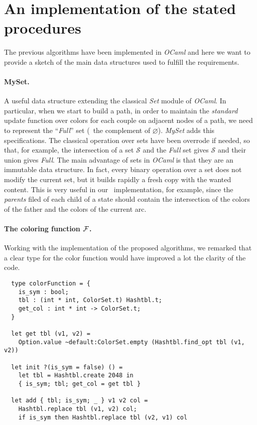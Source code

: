 \section{An implementation of the stated procedures}

The previous algorithms have been implemented in \textit{OCaml} and here we want to provide a sketch of the main data structures used to fulfill the requirements.

\paragraph{MySet.} A useful data structure extending the classical \textit{Set} module of \textit{OCaml}. In particular, when we start to build a path, in order to maintain the \textit{standard} update function over colors for each couple on adjacent nodes of a path, we need to represent the ``\textit{Full}'' set (\ie\ the complement of $\varnothing$). \textit{MySet} adds this specifications. The classical operation over sets have been overrode if needed, so that, for example, the intersection of a set $\mathcal{S}$ and the \textit{Full} set gives $\mathcal{S}$ and their union gives \textit{Full}. The main advantage of sets in \textit{OCaml} is that they are an immutable data structure. In fact, every binary operation over a set does not modify the current set, but it builds rapidly a fresh copy with the wanted content. This is very useful in our \mdd\ implementation, for example, since the \textit{parents} filed of each child of a state should contain the intersection of the colors of the father and the colors of the current arc.

\paragraph{The coloring function $\mathcal{F}$.} Working with the implementation of the proposed algorithms, we remarked that a clear type for the color function would have improved a lot the clarity of the code.

\begin{verbatim}
  type colorFunction = {
    is_sym : bool;
    tbl : (int * int, ColorSet.t) Hashtbl.t;
    get_col : int * int -> ColorSet.t;
  }

  let get tbl (v1, v2) =
    Option.value ~default:ColorSet.empty (Hashtbl.find_opt tbl (v1, v2))

  let init ?(is_sym = false) () =
    let tbl = Hashtbl.create 2048 in
    { is_sym; tbl; get_col = get tbl }

  let add { tbl; is_sym; _ } v1 v2 col =
    Hashtbl.replace tbl (v1, v2) col;
    if is_sym then Hashtbl.replace tbl (v2, v1) col
\end{verbatim}

